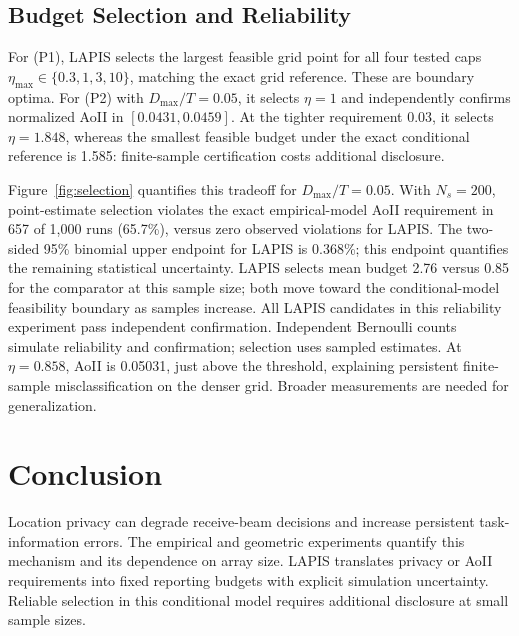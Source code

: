 \subsection{Budget Selection and Reliability}
For (P1), LAPIS selects the largest feasible grid point for all four tested caps $\eta_{\max}\in\{0.3,1,3,10\}$, matching the exact grid reference. These are boundary optima. For (P2) with $D_{\max}/T=0.05$, it selects $\eta=1$ and independently confirms normalized AoII in $[0.0431,0.0459]$. At the tighter requirement 0.03, it selects $\eta=1.848$, whereas the smallest feasible budget under the exact conditional reference is 1.585: finite-sample certification costs additional disclosure.

Figure~\ref{fig:selection} quantifies this tradeoff for $D_{\max}/T=0.05$. With $N_s=200$, point-estimate selection violates the exact empirical-model AoII requirement in 657 of 1,000 runs (65.7\%), versus zero observed violations for LAPIS. The two-sided 95\% binomial upper endpoint for LAPIS is 0.368\%; this endpoint quantifies the remaining statistical uncertainty. LAPIS selects mean budget 2.76 versus 0.85 for the comparator at this sample size; both move toward the conditional-model feasibility boundary as samples increase. All LAPIS candidates in this reliability experiment pass independent confirmation. Independent Bernoulli counts simulate reliability and confirmation; selection uses sampled estimates. At $\eta=0.858$, AoII is 0.05031, just above the threshold, explaining persistent finite-sample misclassification on the denser grid. Broader measurements are needed for generalization.

\section{Conclusion}
Location privacy can degrade receive-beam decisions and increase persistent task-information errors. The empirical and geometric experiments quantify this mechanism and its dependence on array size. LAPIS translates privacy or AoII requirements into fixed reporting budgets with explicit simulation uncertainty. Reliable selection in this conditional model requires additional disclosure at small sample sizes.
